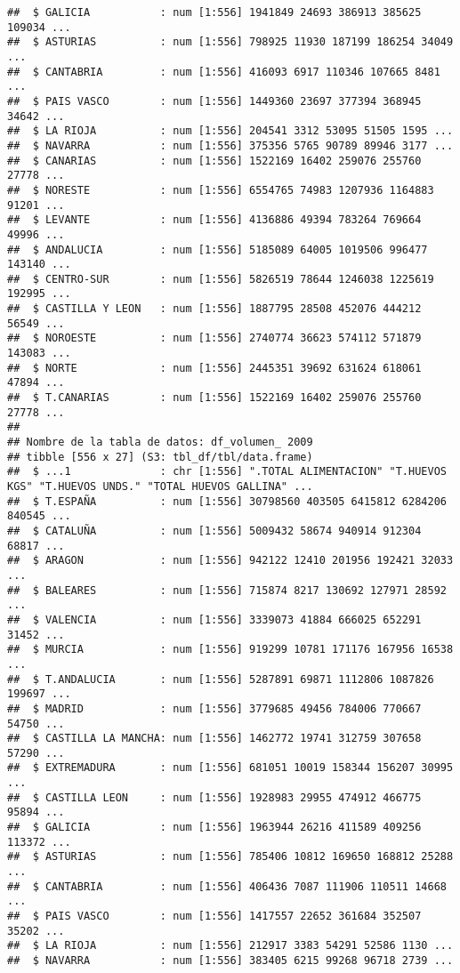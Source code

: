 \documentclass[
]{article}
\begin{document}
\begin{verbatim}
##  $ GALICIA           : num [1:556] 1941849 24693 386913 385625 109034 ...
##  $ ASTURIAS          : num [1:556] 798925 11930 187199 186254 34049 ...
##  $ CANTABRIA         : num [1:556] 416093 6917 110346 107665 8481 ...
##  $ PAIS VASCO        : num [1:556] 1449360 23697 377394 368945 34642 ...
##  $ LA RIOJA          : num [1:556] 204541 3312 53095 51505 1595 ...
##  $ NAVARRA           : num [1:556] 375356 5765 90789 89946 3177 ...
##  $ CANARIAS          : num [1:556] 1522169 16402 259076 255760 27778 ...
##  $ NORESTE           : num [1:556] 6554765 74983 1207936 1164883 91201 ...
##  $ LEVANTE           : num [1:556] 4136886 49394 783264 769664 49996 ...
##  $ ANDALUCIA         : num [1:556] 5185089 64005 1019506 996477 143140 ...
##  $ CENTRO-SUR        : num [1:556] 5826519 78644 1246038 1225619 192995 ...
##  $ CASTILLA Y LEON   : num [1:556] 1887795 28508 452076 444212 56549 ...
##  $ NOROESTE          : num [1:556] 2740774 36623 574112 571879 143083 ...
##  $ NORTE             : num [1:556] 2445351 39692 631624 618061 47894 ...
##  $ T.CANARIAS        : num [1:556] 1522169 16402 259076 255760 27778 ...
##  
## Nombre de la tabla de datos: df_volumen_ 2009 
## tibble [556 x 27] (S3: tbl_df/tbl/data.frame)
##  $ ...1              : chr [1:556] ".TOTAL ALIMENTACION" "T.HUEVOS KGS" "T.HUEVOS UNDS." "TOTAL HUEVOS GALLINA" ...
##  $ T.ESPAÑA          : num [1:556] 30798560 403505 6415812 6284206 840545 ...
##  $ CATALUÑA          : num [1:556] 5009432 58674 940914 912304 68817 ...
##  $ ARAGON            : num [1:556] 942122 12410 201956 192421 32033 ...
##  $ BALEARES          : num [1:556] 715874 8217 130692 127971 28592 ...
##  $ VALENCIA          : num [1:556] 3339073 41884 666025 652291 31452 ...
##  $ MURCIA            : num [1:556] 919299 10781 171176 167956 16538 ...
##  $ T.ANDALUCIA       : num [1:556] 5287891 69871 1112806 1087826 199697 ...
##  $ MADRID            : num [1:556] 3779685 49456 784006 770667 54750 ...
##  $ CASTILLA LA MANCHA: num [1:556] 1462772 19741 312759 307658 57290 ...
##  $ EXTREMADURA       : num [1:556] 681051 10019 158344 156207 30995 ...
##  $ CASTILLA LEON     : num [1:556] 1928983 29955 474912 466775 95894 ...
##  $ GALICIA           : num [1:556] 1963944 26216 411589 409256 113372 ...
##  $ ASTURIAS          : num [1:556] 785406 10812 169650 168812 25288 ...
##  $ CANTABRIA         : num [1:556] 406436 7087 111906 110511 14668 ...
##  $ PAIS VASCO        : num [1:556] 1417557 22652 361684 352507 35202 ...
##  $ LA RIOJA          : num [1:556] 212917 3383 54291 52586 1130 ...
##  $ NAVARRA           : num [1:556] 383405 6215 99268 96718 2739 ...

\end{verbatim}
\end{document}
